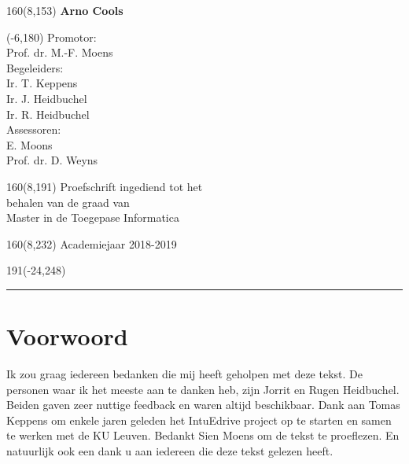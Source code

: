 \documentclass[12pt,a4paper,oneside]{book}
\newcommand\blankpage{%
    \null
    \thispagestyle{empty}%
    \addtocounter{page}{-1}%
    \newpage}
\begin{document}
\begin{textblock}{160}(8,153)
\textblockcolour{}
\vspace{-\parskip}
\flushright
\fontsize{14}{16}\selectfont \textbf{Arno Cools}
\end{textblock}
%
\begin{textblock}{70}(-6,180)
\textblockcolour{}
\flushleft
Promotor:\\Prof. dr. M.-F. Moens\\[-2pt]
\vspace{5mm}
Begeleiders:\\
Ir. T. Keppens\\Ir. J. Heidbuchel\\Ir. R. Heidbuchel\\[-2pt]
\vspace{5mm}
Assessoren:\\
E. Moons\\Prof. dr. D. Weyns\\[-2pt]
\end{textblock}
%
\begin{textblock}{160}(8,191)
\textblockcolour{}
\vspace{-\parskip}
\flushright
Proefschrift ingediend tot het\\[4.5pt]
behalen van de graad van\\[4.5pt]
Master in de Toegepase Informatica\\
\end{textblock}
%
\begin{textblock}{160}(8,232)
\textblockcolour{}
\vspace{-\parskip}
\flushright
Academiejaar 2018-2019
\end{textblock}
%
\begin{textblock}{191}(-24,248)
{\color{blueline}\rule{550pt}{5.5pt}}
\end{textblock}
%
\vfill
\newpage

\rmfamily
\frontmatter
\afterpage{\blankpage}
\setcounter{page}{1}
\chapter{Voorwoord}
Ik zou graag iedereen bedanken die mij heeft geholpen met deze tekst. De personen waar ik het meeste aan te danken heb, zijn Jorrit en Rugen Heidbuchel. Beiden gaven zeer nuttige feedback en waren altijd beschikbaar. Dank aan Tomas Keppens om enkele jaren geleden het IntuEdrive project op te starten en samen te werken met de KU Leuven. Bedankt Sien Moens om de tekst te proeflezen. En natuurlijk ook een dank u aan iedereen die deze tekst gelezen heeft.
\end{document}
